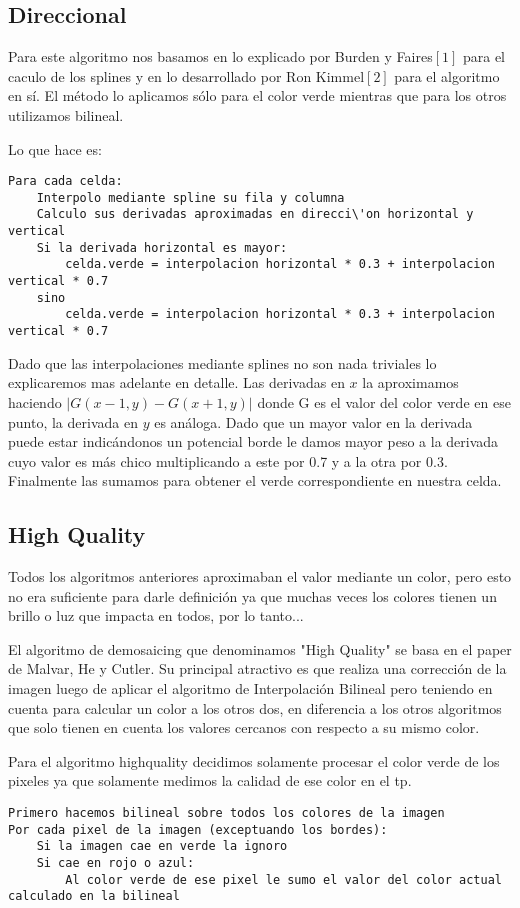 \subsection{Direccional}

Para este algoritmo nos basamos en lo explicado por Burden y Faires$[1]$ para el caculo de los splines y en lo desarrollado por Ron Kimmel$[2]$ para el algoritmo en sí. El método lo aplicamos sólo para el color verde mientras que para los otros utilizamos bilineal. 

Lo que hace es:
\begin{lstlisting}[frame=single] 
Para cada celda:
	Interpolo mediante spline su fila y columna
	Calculo sus derivadas aproximadas en direcci\'on horizontal y vertical
	Si la derivada horizontal es mayor:
		celda.verde = interpolacion horizontal * 0.3 + interpolacion vertical * 0.7
	sino
		celda.verde = interpolacion horizontal * 0.3 + interpolacion vertical * 0.7
\end{lstlisting}

Dado que las interpolaciones mediante splines no son nada triviales lo explicaremos mas adelante en detalle. Las derivadas en $x$  la aproximamos haciendo $|G(x-1,y)-G(x+1,y)|$ donde G es el valor del color verde en ese punto, la derivada en $y$ es análoga. Dado que un mayor valor en la derivada puede estar indicándonos un potencial borde le damos mayor peso a la derivada cuyo valor es más chico multiplicando a este por 0.7 y a la otra por 0.3. Finalmente las sumamos para obtener el verde correspondiente en nuestra celda.

\subsection{High Quality}

Todos los algoritmos anteriores aproximaban el valor mediante un color, pero esto no era suficiente para darle definición ya que muchas veces los colores tienen un brillo o luz que impacta en todos, por lo tanto... 

El algoritmo de demosaicing que denominamos "High Quality" se basa en el paper de Malvar, He y Cutler. Su principal atractivo es que realiza una corrección de la imagen luego de aplicar el algoritmo de Interpolación Bilineal pero teniendo en cuenta para calcular un color a los otros dos, en diferencia a los otros algoritmos que solo tienen en cuenta los valores cercanos con respecto a su mismo color.

Para el algoritmo highquality decidimos solamente procesar el color verde de los pixeles ya que solamente medimos la calidad de ese color en el tp.

\begin{lstlisting}[frame=single] 
Primero hacemos bilineal sobre todos los colores de la imagen
Por cada pixel de la imagen (exceptuando los bordes):
	Si la imagen cae en verde la ignoro
	Si cae en rojo o azul:
		Al color verde de ese pixel le sumo el valor del color actual calculado en la bilineal
\end{lstlisting}